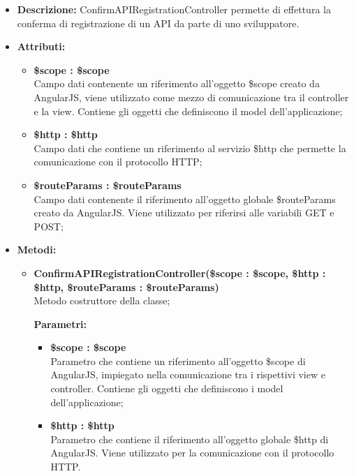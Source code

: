 \begin{itemize}
	\item \textbf{Descrizione:} ConfirmAPIRegistrationController permette di effettura la conferma di registrazione di un API da parte di uno sviluppatore.
	\item \textbf{Attributi:}
	\begin{itemize}
		
		\item \textbf{\$scope : \$scope}\\
		Campo dati contenente un riferimento all'oggetto \$scope creato da AngularJS, viene utilizzato come mezzo di comunicazione tra il controller e la view. Contiene gli oggetti che definiscono il model dell'applicazione;
		
		\item \textbf{\$http : \$http }\\
		Campo dati che contiene un riferimento al servizio \$http che permette la comunicazione con il protocollo HTTP;
		
		\item \textbf{\$routeParams : \$routeParams }\\
		Campo dati contenente il riferimento all'oggetto globale \$routeParams creato da AngularJS. Viene utilizzato per riferirsi alle variabili GET e POST;				
		
	\end{itemize}
	\item \textbf{Metodi:}
	\begin{itemize}
		
		\item \textbf{ConfirmAPIRegistrationController(\$scope : \$scope, \$http : \$http, \$routeParams : \$routeParams)}\\
		Metodo costruttore della classe;
		\begin{description}
			\item[\textbf{Parametri:}]
		\end{description}
		\begin{itemize}
			\item \textbf{\$scope : \$scope}\\
			Parametro che contiene un riferimento all'oggetto \$scope di AngularJS, impiegato nella comunicazione tra i rispettivi view e controller. Contiene gli oggetti che definiscono i model dell'applicazione;
			
			\item \textbf{\$http : \$http}\\
			Parametro che contiene il riferimento all'oggetto globale \$http di AngularJS. Viene utilizzato per la comunicazione con il protocollo HTTP.
			

\end{itemize}
\end{itemize}
\end{itemize}
